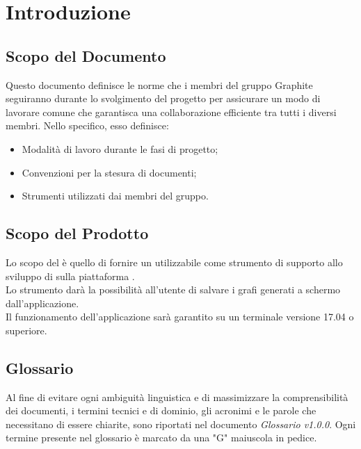 \documentclass[./NormediProgetto.tex]{subfiles}
\begin{document}
	
\chapter{Introduzione}

\section{Scopo del Documento}

Questo documento definisce le norme che i membri del gruppo Graphite seguiranno durante lo svolgimento del progetto per assicurare un modo di lavorare comune
che garantisca una collaborazione efficiente tra tutti i diversi
membri. Nello specifico, esso definisce:

\begin{itemize}
	\item Modalità di lavoro durante le fasi di progetto;
	\item Convenzioni per la stesura di documenti;
	\item Strumenti utilizzati dai membri del gruppo.
\end{itemize}

\section{Scopo del Prodotto}

Lo scopo del  è quello di fornire un  utilizzabile come strumento di supporto allo sviluppo di  sulla piattaforma . 
\\ \noindent Lo strumento darà la possibilità all'utente di salvare i grafi generati a schermo dall'applicazione.
\\ \noindent Il funzionamento dell'applicazione sarà garantito su un terminale  versione 17.04 o superiore.

\section{Glossario}

Al fine di evitare ogni ambiguità linguistica e di massimizzare la comprensibilità dei documenti, i termini tecnici e di dominio, gli acronimi e le parole che necessitano di essere chiarite, sono riportati nel documento \textit{Glossario v1.0.0}.
Ogni termine presente nel glossario è marcato da una "G" maiuscola in pedice.
\end{document}
